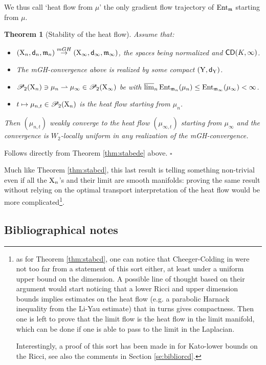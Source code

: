 \documentclass[11pt]{article}
\numberwithin{equation}{section}
\newtheorem{theorem}{Theorem}[section]
\newenvironment{idea}{\removelastskip\par\medskip   %
\noindent{\em Idea of the proof} \rm}{\penalty-20\null\hfill$\square$\par\medbreak}
\newcommand{\prd}{\mathscr P_2}
\newcommand{\X}{{\rm X}}
\newcommand{\Y}{{\rm Y}}
\newcommand{\sfd}{{\sf d}}
\newcommand{\mm}{{\mathfrak m}}
\newcommand{\CD}{{\sf CD}}
\newcommand{\ent}{{\rm Ent}_\mm}
\newcommand{\entm}[1]{{\rm Ent}_{#1}}
\newcommand{\lims}{\varlimsup}
\newcommand{\weakto}{\rightharpoonup}
\begin{document}
We thus call `heat flow from $\mu$' the only gradient flow trajectory of $\ent$ starting from $\mu$. 
\begin{theorem}[Stability of the heat flow]\label{thm:stabheat}
Assume that:
\begin{itemize}
\item[i)] $(\X_n,\sfd_n,\mm_n)\stackrel{mGH}\to(\X_\infty,\sfd_\infty,\mm_\infty)$, the spaces being normalized and $\CD(K,\infty)$.
\item[ii)] The mGH-convergence above is realized by some compact $(\Y,\sfd_\Y)$.
\item[iii)] $\prd(\X_n)\ni \mu_n\weakto\mu_\infty\in\prd(\X_\infty)$  be with $\lims_n\entm{\mm_n}(\mu_n)\leq\entm{\mm_\infty}(\mu_\infty)<\infty$.
\item[iv)] $t\mapsto\mu_{n,t}\in \prd(\X_n)$ is the heat flow starting from $\mu_n$.
\end{itemize} 
Then $(\mu_{n,t})$ weakly converge to the heat flow $(\mu_{\infty,t})$ starting  from $\mu_\infty$ and the convergence is $W_2$-locally uniform in any realization of the mGH-convergence.
\end{theorem}
\begin{idea}
 Follows directly from Theorem \ref{thm:stabede} above.
 \end{idea}
Much like Theorem \ref{thm:stabcd}, this last result is telling something non-trivial even if all the $\X_n$'s and their limit are smooth manifolds: proving the same result without relying on the optimal transport interpretation of the heat flow would be more complicated\footnote{as for Theorem \ref{thm:stabcd}, one can notice that Cheeger-Colding in \cite{Cheeger-Colding97I,Cheeger-Colding97II,Cheeger-Colding97III} were not too far from a statement of this sort either, at least under a uniform upper bound on the dimension. A possible line of thought based on their argument would start noticing that a lower Ricci and upper dimension bounds implies estimates on the heat flow (e.g. a parabolic Harnack inequality from the Li-Yau estimate) that in turns gives compactness. Then one is left to prove that the limit flow is the heat flow in the limit manifold, which can be done if one is able to pass to the limit in the Laplacian.

Interestingly, a proof of this sort has been made in \cite{CMTkatoI} for Kato-lower bounds on the Ricci, see also the comments in Section \ref{se:bibliorcd}.}.

\subsection{Bibliographical notes}
\end{document}
